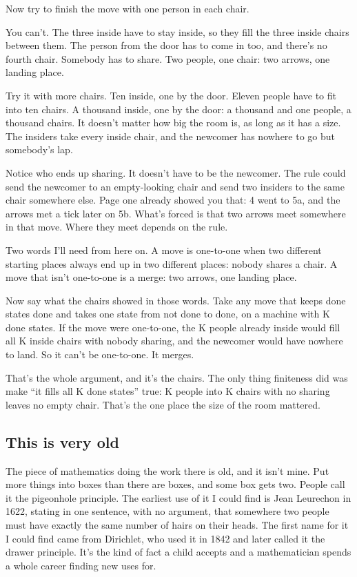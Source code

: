 \documentclass[11pt,twoside]{article}
\theoremstyle{thielethm}
\theoremstyle{thieledef}
\theoremstyle{thieledef}
\theoremstyle{thieledef}
\theoremstyle{thielethm}
\theoremstyle{thieleobs}
\theoremstyle{thielethm}
\begin{document}
Now try to finish the move with one person in each chair.

You can't. The three inside have to stay inside, so they fill the three inside chairs between them. The person from the door has to come in too, and there's no fourth chair. Somebody has to share. Two people, one chair: two arrows, one landing place.

Try it with more chairs. Ten inside, one by the door. Eleven people have to fit into ten chairs. A thousand inside, one by the door: a thousand and one people, a thousand chairs. It doesn't matter how big the room is, as long as it has a size. The insiders take every inside chair, and the newcomer has nowhere to go but somebody's lap.

Notice who ends up sharing. It doesn't have to be the newcomer. The rule could send the newcomer to an empty-looking chair and send two insiders to the same chair somewhere else. Page one already showed you that: 4 went to 5a, and the arrows met a tick later on 5b. What's forced is that two arrows meet somewhere in that move. Where they meet depends on the rule.

Two words I'll need from here on. A move is one-to-one when two different starting places always end up in two different places: nobody shares a chair. A move that isn't one-to-one is a merge: two arrows, one landing place.

Now say what the chairs showed in those words. Take any move that keeps done states done and takes one state from not done to done, on a machine with K done states. If the move were one-to-one, the K people already inside would fill all K inside chairs with nobody sharing, and the newcomer would have nowhere to land. So it can't be one-to-one. It merges.

That's the whole argument, and it's the chairs. The only thing finiteness did was make ``it fills all K done states'' true: K people into K chairs with no sharing leaves no empty chair. That's the one place the size of the room mattered.

\subsection{This is very old}

The piece of mathematics doing the work there is old, and it isn't mine. Put more things into boxes than there are boxes, and some box gets two. People call it the pigeonhole principle. The earliest use of it I could find is Jean Leurechon in 1622, stating in one sentence, with no argument, that somewhere two people must have exactly the same number of hairs on their heads. The first name for it I could find came from Dirichlet, who used it in 1842 and later called it the drawer principle. It's the kind of fact a child accepts and a mathematician spends a whole career finding new uses for.
\end{document}
